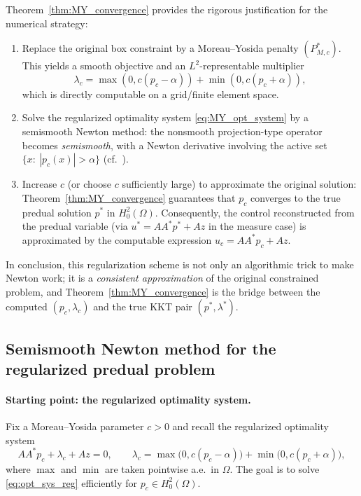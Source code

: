 \documentclass[11pt,a4paper]{article}
\begin{document}
Theorem~\ref{thm:MY_convergence} provides the rigorous justification for the numerical strategy:
\begin{enumerate}
\item Replace the original box constraint by a Moreau--Yosida penalty $(P_{M,c}^\ast)$.
      This yields a smooth objective and an $L^2$-representable multiplier
      \[
      \lambda_c = \max(0,c(p_c-\alpha))+\min(0,c(p_c+\alpha)),
      \]
      which is directly computable on a grid/finite element space.
\item Solve the regularized optimality system \eqref{eq:MY_opt_system} by a semismooth Newton method:
      the nonsmooth projection-type operator becomes \emph{semismooth}, with a Newton derivative involving the active set
      $\{x:\ |p_c(x)|>\alpha\}$ (cf.\ \cite{ClasonKunisch2009}).
\item Increase $c$ (or choose $c$ sufficiently large) to approximate the original solution:
      Theorem~\ref{thm:MY_convergence} guarantees that $p_c$ converges to the true predual solution $p^\ast$ in $H^2_0(\Omega)$.
      Consequently, the control reconstructed from the predual variable (via $u^\ast = AA^\ast p^\ast + Az$ in the measure case)
      is approximated by the computable expression $u_c = AA^\ast p_c + Az$.
\end{enumerate}

In conclusion, this regularization scheme is not only an algorithmic trick to make Newton work; it is a \emph{consistent approximation} of the original constrained problem, and Theorem~\ref{thm:MY_convergence} is the bridge between the computed $(p_c,\lambda_c)$ and the true KKT pair $(p^\ast,\lambda^\ast)$.

\subsection{Semismooth Newton method for the regularized predual problem}
\label{sec:ssn}

\paragraph{Starting point: the regularized optimality system.}
Fix a Moreau--Yosida parameter $c>0$ and recall the regularized optimality system
\begin{equation}\label{eq:opt_sys_reg}
AA^\ast p_c + \lambda_c + Az = 0,
\qquad
\lambda_c = \max\!\bigl(0,c(p_c-\alpha)\bigr)+\min\!\bigl(0,c(p_c+\alpha)\bigr),
\end{equation}
where $\max$ and $\min$ are taken pointwise a.e.\ in $\Omega$.
The goal is to solve \eqref{eq:opt_sys_reg} efficiently for $p_c\in H_0^2(\Omega)$.
\end{document}
